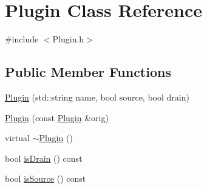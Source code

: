 \hypertarget{class_plugin}{\section{Plugin Class Reference}
\label{class_plugin}
}


{\ttfamily \#include $<$Plugin.\-h$>$}

\subsection*{Public Member Functions}
\begin{DoxyCompactItemize}
\item 
\hyperlink{class_plugin_a1180a8be15f3a920f1044e528d807ea1}{Plugin} (std\-::string name, bool source, bool drain)
\item 
\hyperlink{class_plugin_acececc8908162c6b0c883e62995abad8}{Plugin} (const \hyperlink{class_plugin}{Plugin} \&orig)
\item 
virtual \hyperlink{class_plugin_aee4cc1864a2afa84a9ad935153f3fe39}{$\sim$\-Plugin} ()
\item 
bool \hyperlink{class_plugin_a1f1610d1eee7009dedf030f8495ab748}{is\-Drain} () const 
\item 
bool \hyperlink{class_plugin_a87ed4a6c7eab8e84a650c4e057f15dd1}{is\-Source} () const 
\end{DoxyCompactItemize}


